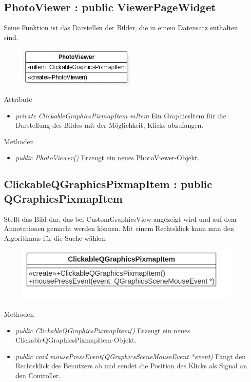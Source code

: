 \subsection*{PhotoViewer : public ViewerPageWidget}
Seine Funktion ist das Darstellen der Bilder, die in einem Datensatz enthalten sind.

\begin{figure}[H]
	\centering
	\includegraphics[scale=0.5]{img/Klassendiagramm/Klassen/View/PhotoViewer}
	\label{fig:photoVIewer}
\end{figure}

Attribute
\begin{itemize}
	\item\textit{private ClickableGraphicsPixmapItem mItem} 
	Ein GraphicsItem für die Darstellung des Bildes mit der Möglichkeit, Klicks abzufangen.    
\end{itemize}

Methoden
\begin{itemize}
	\item\textit{public PhotoViewer()}
	 Erzeugt ein neues PhotoViewer-Objekt.
\end{itemize}

\subsection*{ClickableQGraphicsPixmapItem : public QGraphicsPixmapItem}
Stellt das Bild dar, das bei CustomGraphicsView angezeigt wird und auf dem Annotationen gemacht werden können. Mit einem Rechtsklick kann man den Algorithmus für die Suche wählen.

\begin{figure}[H]
	\centering
	\includegraphics[scale=0.5]{img/Klassendiagramm/Klassen/View/ClickableQGraphicsPixmapItem}
	\label{fig:clickableQGraphicsPixmapItem}
\end{figure}

Methoden
\begin{itemize}
	\item\textit{public ClickableQGraphicsPixmapItem()} 
	Erzeugt ein neues ClickableQGraphicsPixmapItem-Objekt.
	\item\textit{public void mousePressEvent(QGraphicsSceneMouseEvent *event)} 
	Fängt den Rechtsklick des Benutzers ab und sendet die Position des Klicks als Signal an den Controller.
\end{itemize}

